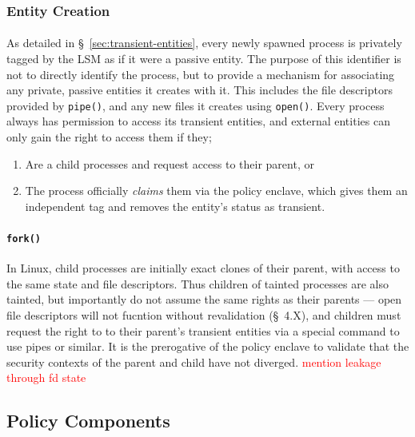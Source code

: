 \subsubsection{Entity Creation}
\label{sec:entity-creation}
\paragraph{} As detailed in §~\ref{sec:transient-entities}, every newly spawned process is privately tagged by the LSM as if it were a passive entity. The purpose of this identifier is not to directly identify the process, but to provide a mechanism for associating any private, passive entities it creates with it. This includes the file descriptors provided by \texttt{pipe()}, and any new files it creates using \texttt{open()}. Every process always has permission to access its transient entities, and external entities can only gain the right to access them if they;
\begin{enumerate}
    \item Are a child processes and request access to their parent, or
    \item The process officially \textit{claims} them via the policy enclave, which gives them an independent tag and removes the entity's status as transient. 
\end{enumerate}


\paragraph{\texttt{fork()}} In Linux, child processes are initially exact clones of their parent, with access to the same state and file descriptors. Thus children of tainted processes are also tainted, but importantly do not assume the same rights as their parents --- open file descriptors will not fucntion without revalidation (§~4.X), and children must request the right to to their parent's transient entities via a special command to use pipes or similar. It is the prerogative of the policy enclave to validate that the security contexts of the parent and child have not diverged. \textcolor{red}{mention leakage through fd state}





\subsection{Policy Components}
\label{sec:policy-enclave}

